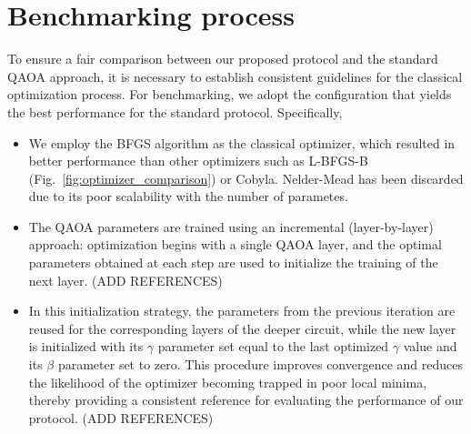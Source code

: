 \section{Benchmarking process}
To ensure a fair comparison between our proposed protocol and the standard QAOA approach, it is necessary to establish
consistent guidelines for the classical optimization process. For benchmarking, we adopt the configuration that yields
the best performance for the standard protocol. Specifically,
\begin{itemize}
    \item We employ the BFGS algorithm as the classical optimizer, which resulted in better performance
    than other optimizers such as L-BFGS-B (Fig.~\ref{fig:optimizer_comparison}) or Cobyla. Nelder-Mead has been discarded
    due to its poor scalability with the number of parametes.
    \item The QAOA parameters are trained using an incremental (layer-by-layer) approach: optimization begins with
    a single QAOA layer, and the optimal parameters obtained at each step are used to initialize the training of
    the next layer. {\color{red} (ADD REFERENCES)}
    \item In this initialization strategy, the parameters from the previous iteration are reused for the corresponding
    layers of the deeper circuit, while the new layer is initialized with its $\gamma$ parameter set equal to the last
    optimized $\gamma$ value and its $\beta$ parameter set to zero. This procedure improves convergence and reduces the
    likelihood of the optimizer becoming trapped in poor local minima, thereby providing a consistent reference
    for evaluating the performance of our protocol. {\color{red} (ADD REFERENCES)}
\end{itemize}